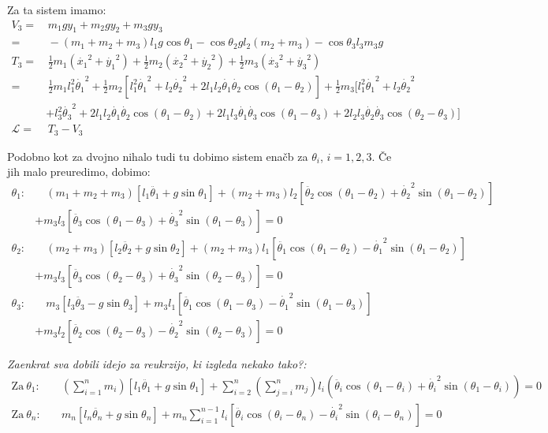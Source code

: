 \documentclass[a4paper,11pt]{article}
\begin{document}
Za ta sistem imamo:
\begin{align*}
    V_3 =& \, m_1 g y_1 + m_2 g y_2 + m_3 g y_3 \\
    =& \, -(m_1 + m_2 + m_3)l_1 g \cos \theta_1 - \cos \theta_2 g l_2 (m_2 + m_3) - \cos\theta_3 l_3 m_3 g\\
    T_3 =& \, \frac{1}{2} m_1 (\dot{x_1}^2 + \dot{y_1}^2) + \frac{1}{2} m_2 (\dot{x_2}^2 + \dot{y_2}^2) + \frac{1}{2} m_3 (\dot{x_3}^2 + \dot{y_3}^2)\\
    =& \, \frac{1}{2} m_1 l_1^2 \dot{\theta_1}^2 + \frac{1}{2}m_2 [l_1^2 \dot{\theta_1}^2 + l_2 \dot{\theta_2}^2 + 2l_1l_2 \dot{\theta_1}\dot{\theta_2} \cos (\theta_1 - \theta_2)] + \frac{1}{2} m_3 [l_1^2 \dot{\theta_1}^2 + l_2 \dot{\theta_2}^2 \\
    &+ l_3^2 \dot{\theta_3}^2 + 2 l_1 l_2 \dot{\theta_1}\dot{\theta_2} \cos (\theta_1 - \theta_2) + 2 l_1 l_3 \dot{\theta_1}\dot{\theta_3} \cos (\theta_1 - \theta_3) + 2 l_2 l_3 \dot{\theta_2}\dot{\theta_3} \cos (\theta_2 - \theta_3)]\\
    \mathcal{L} =&\, T_3 - V_3
\end{align*}

Podobno kot za dvojno nihalo tudi tu dobimo sistem enačb za $\theta_i$, $i=1,2,3$. Če jih malo preuredimo, dobimo:
\begin{align*}
    \theta_1: &\quad (m_1 + m_2 + m_3) [l_1 \ddot{\theta_1} + g \sin \theta_1] + (m_2 + m_3) l_2 [\ddot{\theta_2} \cos (\theta_1 - \theta_2) + \dot{\theta_2}^2 \sin (\theta_1 - \theta_2)] \\
    & + m_3 l_3 [\ddot{\theta_3} \cos(\theta_1 - \theta_3) + \dot{\theta_3}^2 \sin (\theta_1 - \theta_3)]  = 0\\
    \theta_2: &\quad (m_2 + m_3) [l_2 \ddot{\theta_2} + g \sin \theta_2] + (m_2 + m_3) l_1 [\ddot{\theta_1} \cos (\theta_1 - \theta_2) - \dot{\theta_1}^2 \sin(\theta_1 - \theta_2)] \\
    & + m_3 l_3 [\ddot{\theta_3} \cos(\theta_2 - \theta_3) + \dot{\theta_3}^2 \sin(\theta_2 - \theta_3)] = 0\\
    \theta_3: &\quad m_3 [l_3 \ddot{\theta_3} - g \sin \theta_3] + m_3 l_1 [\ddot{\theta_1} \cos(\theta_1 -\theta_3) - \dot{\theta_1}^2 \sin (\theta_1 - \theta_3)] \\
    & + m_3 l_2 [\ddot{\theta_2}\cos(\theta_2 - \theta_3) - \dot{\theta_2}^2 \sin(\theta_2 - \theta_3)] = 0
\end{align*}

\textit{Zaenkrat sva dobili idejo za reukrzijo, ki izgleda nekako tako?:}
\begin{align*}
    \text{Za} \ \theta_1: &\quad (\sum_{i=1}^n m_i)[l_1 \ddot{\theta_1} + g \sin \theta_1] + \sum_{i=2}^n (\sum_{j=i}^n m_j) l_i (\ddot{\theta_i} \cos (\theta_1 - \theta_i) + \dot{\theta_i}^2 \sin(\theta_1 - \theta_i)) = 0\\
    \text{Za} \ \theta_n: &\quad m_n [l_n \ddot{\theta_n} + g \sin \theta_n] + m_n \sum_{i=1}^{n-1} l_i [\ddot{\theta_i} \cos(\theta_i - \theta_n) - \dot{\theta_i}^2 \sin (\theta_i - \theta_n)] = 0
\end{align*}

\printbibliography
\end{document}
